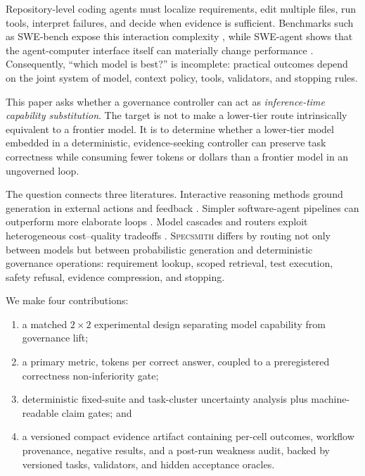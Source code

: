 \documentclass[10pt,twocolumn]{article}
\newcommand{\specsmith}{\textsc{Specsmith}}
\begin{document}
Repository-level coding agents must localize requirements, edit multiple
files, run tools, interpret failures, and decide when evidence is sufficient.
Benchmarks such as SWE-bench expose this interaction complexity
\citep{jimenez2024swebench}, while SWE-agent shows that the agent-computer
interface itself can materially change performance \citep{yang2024sweagent}.
Consequently, ``which model is best?'' is incomplete: practical outcomes depend
on the joint system of model, context policy, tools, validators, and stopping
rules.

This paper asks whether a governance controller can act as
\emph{inference-time capability substitution}. The target is not to make a
lower-tier route intrinsically equivalent to a frontier model. It is to determine
whether a lower-tier model embedded in a deterministic, evidence-seeking
controller can preserve task correctness while consuming fewer tokens or
dollars than a frontier model in an ungoverned loop.

The question connects three literatures. Interactive reasoning methods ground
generation in external actions and feedback \citep{yao2023react,
shinn2023reflexion,madaan2023selfrefine}. Simpler software-agent pipelines can
outperform more elaborate loops \citep{xia2024agentless}. Model cascades and
routers exploit heterogeneous cost--quality tradeoffs \citep{chen2023frugalgpt,
ong2024routellm}. \specsmith{} differs by routing not only between models but
between probabilistic generation and deterministic governance operations:
requirement lookup, scoped retrieval, test execution, safety refusal, evidence
compression, and stopping.

We make four contributions:
\begin{enumerate}
  \item a matched $2\times2$ experimental design separating model capability
        from governance lift;
  \item a primary metric, tokens per correct answer, coupled to a preregistered
        correctness non-inferiority gate;
  \item deterministic fixed-suite and task-cluster uncertainty analysis plus
        machine-readable claim gates; and
  \item a versioned compact evidence artifact containing per-cell outcomes,
        workflow provenance, negative results, and a post-run weakness audit,
        backed by versioned tasks, validators, and hidden acceptance oracles.
\end{enumerate}
\end{document}
